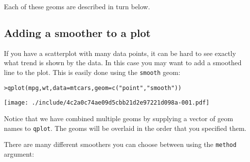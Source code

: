 Each of these geoms are described in turn below.

\subsection{Adding a smoother to a plot}\label{sub:smooth}

If you have a scatterplot with many data points, it can be hard to see exactly what trend is shown by the data.  In this case you may want to add a smoothed line to the plot.  This is easily done using the {\tt smooth} geom:

\begin{alltt}
> qplot(mpg, wt, data = mtcars, geom = c("point", "smooth"))
\end{alltt}
\texttt{[image: ./include/4c2a0c74ae09d5cbb21d2e97221d098a-001.pdf]}
\begin{alltt}

\end{alltt}

Notice that we have combined multiple geoms by supplying a vector of geom names to {\tt qplot}.  The geoms will be overlaid in the order that you specified them.

There are many different smoothers you can choose between using the {\tt method} argument:

